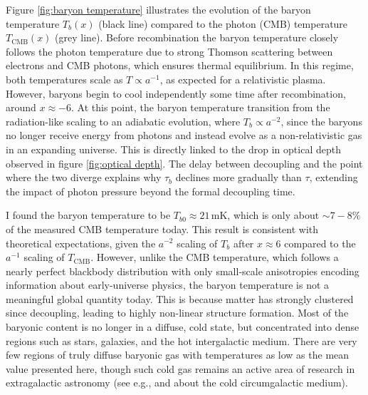 \documentclass{aa}
\numberwithin{equation}{section}
\numberwithin{table}{section}
\numberwithin{figure}{section}
\begin{document}
Figure \ref{fig:baryon temperature} illustrates the evolution of the baryon temperature $T_b(x)$ (black line) compared to the photon (CMB) temperature $T_\text{CMB}(x)$ (grey line). Before recombination the baryon temperature closely follows the photon temperature due to strong Thomson scattering between electrons and CMB photons, which ensures thermal equilibrium. In this regime, both temperatures scale as $T \propto a^{-1}$, as expected for a relativistic plasma. However, 
baryons begin to cool independently some time after recombination, around $x\approx-6$. At this point, the baryon temperature transition from the radiation-like scaling to an adiabatic evolution, where $T_b \propto a^{-2}$, since the baryons no longer receive energy from photons and instead evolve as a non-relativistic gas in an expanding universe. This is directly linked to the drop in optical depth observed in figure \ref{fig:optical depth}. The delay between decoupling and the point where the two diverge explains why $\tau_b$ declines more gradually than $\tau$, extending the impact of photon pressure beyond the formal decoupling time. 

I found the baryon temperature to be $T_{b0} \approx 21\,\text{mK}$, which is only about $\sim 7-8\%$ of the measured CMB temperature today. This result is consistent with theoretical expectations, given the $a^{-2}$ scaling of $T_b$ after $x\approx 6$ compared to the $a^{-1}$ scaling of $T_\text{CMB}$. However, unlike the CMB temperature, which follows a nearly perfect blackbody distribution with only small-scale anisotropies encoding information about early-universe physics, the baryon temperature is not a meaningful global quantity today. This is because matter has strongly clustered since decoupling, leading to highly non-linear structure formation. Most of the baryonic content is no longer in a diffuse, cold state, but concentrated into dense regions such as stars, galaxies, and the hot intergalactic medium. There are very few regions of truly diffuse baryonic gas with temperatures as low as the mean value presented here, though such cold gas remains an active area of research in extragalactic astronomy (see e.g., \cite{tumlinson2017circumgalactic} and \cite{nelson2020cold} about the cold circumgalactic medium).
\end{document}
